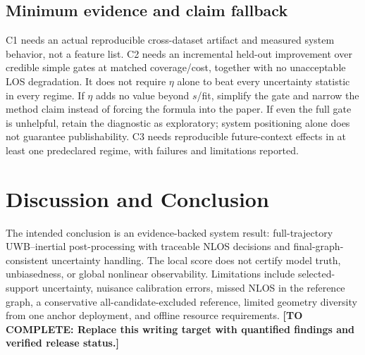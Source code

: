 \documentclass[conference]{IEEEtran}%
\newcommand{\todo}[1]{\textcolor{red!70!black}{\textbf{[TO COMPLETE: #1]}}}
\begin{document}
\subsection{Minimum evidence and claim fallback}
C1 needs an actual reproducible cross-dataset artifact and measured system behavior, not a feature list. C2 needs an incremental held-out improvement over credible simple gates at matched coverage/cost, together with no unacceptable LOS degradation. It does not require $\eta$ alone to beat every uncertainty statistic in every regime. If $\eta$ adds no value beyond $s$/fit, simplify the gate and narrow the method claim instead of forcing the formula into the paper. If even the full gate is unhelpful, retain the diagnostic as exploratory; system positioning alone does not guarantee publishability. C3 needs reproducible future-context effects in at least one predeclared regime, with failures and limitations reported.

\section{Discussion and Conclusion}
\label{sec:conclusion}
The intended conclusion is an evidence-backed system result: full-trajectory UWB--inertial post-processing with traceable NLOS decisions and final-graph-consistent uncertainty handling. The local score does not certify model truth, unbiasedness, or global nonlinear observability. Limitations include selected-support uncertainty, nuisance calibration errors, missed NLOS in the reference graph, a conservative all-candidate-excluded reference, limited geometry diversity from one anchor deployment, and offline resource requirements. \todo{Replace this writing target with quantified findings and verified release status.}
\end{document}
